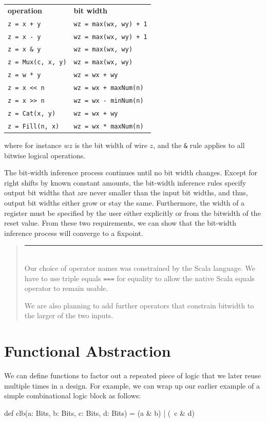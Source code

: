 \documentclass[twocolumn,10pt]{article}
\newenvironment{commentary}
{ \vspace{-0.1in}
  \begin{quotation}
  \noindent
  \small \em
  \rule{\linewidth}{1pt}\\
}
{
  \end{quotation}
}
\def\code#1{{\tt #1}}
\begin{document}
\begin{tabular}{ll}
{\bf operation} & {\bf bit width} \\ 
\verb|z = x + y| & \verb|wz = max(wx, wy) + 1| \\
\verb+z = x - y+ & \verb|wz = max(wx, wy) + 1|\\
\verb+z = x & y+ & \verb+wz = max(wx, wy)+ \\
\verb+z = Mux(c, x, y)+ & \verb+wz = max(wx, wy)+ \\
\verb+z = w * y+ & \verb!wz = wx + wy! \\
\verb+z = x << n+ & \verb!wz = wx + maxNum(n)! \\
\verb+z = x >> n+ & \verb+wz = wx - minNum(n)+ \\
\verb+z = Cat(x, y)+ & \verb!wz = wx + wy! \\
\verb+z = Fill(n, x)+ & \verb+wz = wx * maxNum(n)+ \\
\end{tabular}

\noindent
where for instance $wz$ is the bit width of wire $z$, and the \verb+&+
rule applies to all bitwise logical operations.

The bit-width inference process continues until no bit width changes.
Except for right shifts by known constant amounts, the bit-width
inference rules specify output bit widths that are never smaller than
the input bit widths, and thus, output bit widths either grow or stay
the same.  Furthermore, the width of a register must be specified by
the user either explicitly or from the bitwidth of the reset value.
From these two requirements, we can show that the bit-width inference
process will converge to a fixpoint.

\begin{commentary}
Our choice of operator names was constrained by the Scala language.
We have to use triple equals \code{===} for equality to allow the
native Scala equals operator to remain usable.

We are also planning to add further operators that constrain bitwidth
to the larger of the two inputs.
\end{commentary}

\section{Functional Abstraction}

We can define functions to factor out a repeated piece of logic that
we later reuse multiple times in a design.  For example, we can wrap
up our earlier example of a simple combinational logic block as
follows:
\begin{scala}
def clb(a: Bits, b: Bits, c: Bits, d: Bits) = 
  (a & b) | (~c & d)
\end{scala}
\end{document}
